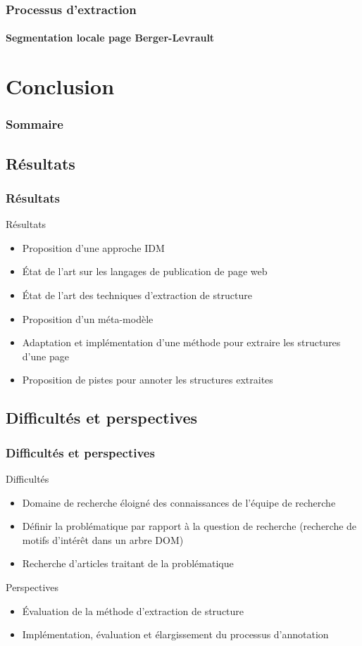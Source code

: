 \documentclass[]{beamer}
\begin{document}
\begin{frame}
	\frametitle{Processus d'extraction}
	\framesubtitle{Segmentation locale page Berger-Levrault}
\end{frame}


\section{Conclusion}
\begin{frame}
  \frametitle{Sommaire}
\end{frame}
\subsection{Résultats}
\begin{frame}
	\frametitle{Résultats}
	\begin{block}{Résultats}
		\begin{itemize}
			\item Proposition d'une approche IDM  
			\item État de l'art sur les langages de publication de page web
			\item État de l'art des techniques d'extraction de structure
			\item Proposition d'un méta-modèle
			\item Adaptation et implémentation d'une méthode pour extraire les structures d'une page
			\item Proposition de pistes pour annoter les structures extraites  
		\end{itemize}
	\end{block}
\end{frame}

\subsection{Difficultés et perspectives}
\begin{frame}
	\frametitle{Difficultés et perspectives}
	\begin{block}{Difficultés}
		\begin{itemize}
			\item Domaine de recherche éloigné des connaissances de l'équipe de recherche
			\item Définir la problématique par rapport à la question de recherche (recherche de motifs d'intérêt dans un arbre DOM)
			\item Recherche d'articles traitant de la problématique
		\end{itemize}
	\end{block}
	\begin{block}{Perspectives}
		\begin{itemize}
			\item Évaluation de la méthode d'extraction de structure
			\item Implémentation, évaluation et élargissement du processus d'annotation
		\end{itemize}
	\end{block}
\end{frame}
 
\end{document}
